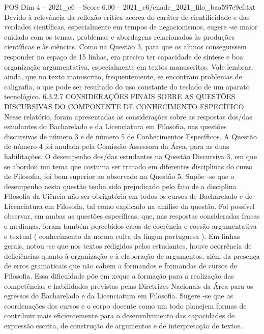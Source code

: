 \begin{textsample}{POS Dim 4 – 2021\_c6 – Score 6.00 – 2021\_c6/enade\_2021\_filo\_baa597e9cf.txt}
Devido à relevância da reflexão crítica acerca do caráter de cientificidade e das verdades científicas, especialmente em tempos de negacionismos, sugere -se maior cuidado com os temas, problemas e abordagens relacionados às produções científicas e às ciências.
Como na Questão 3, para que os alunos conseguissem responder no espaço de 15 linhas, era preciso ter capacidade de síntese e boa organização argumentativa, especialmente em textos manuscritos.
Vale lembrar, ainda, que no texto manuscrito, frequentemente, se encontram problemas de caligrafia, o que pode ser resultado do uso constante do teclado de um aparato tecnológico. 6.3.2.7 CONSIDERAÇÕES FINAIS SOBRE AS QUESTÕES DISCURSIVAS DO COMPONENTE DE CONHECIMENTO ESPECÍFICO Nesse relatório, foram apresentadas as considerações sobre as respostas dos/das estudantes do Bacharelado e da Licenciatura em Filosofia, nas questões discursivas de número 3 e de número 5 de Conhecimentos Específicos.
A Questão de número 4 foi anulada pela Comissão Assessora da Área, para as duas habilitações.
O desempenho dos/das estudantes na Questão Discursiva 3, em que se abordou um tema que costuma ser tratado em diferentes disciplinas do curso de Filosofia, foi bem superior ao observado na Questão 5.
Supõe -se que o desempenho nesta questão tenha sido prejudicado pelo fato de a disciplina Filosofia da Ciência não ser obrigatória em todos os cursos de Bacharelado e de Licenciatura em Filosofia, tal como explicado na análise da questão.
Foi possível observar, em ambas as questões específicas, que, nas respostas consideradas fracas e medianas, foram também percebidos erros de coerência e coesão argumentativa e textual ( conhecimento da norma culta da língua portuguesa ).
Em linhas gerais, notou -se que nos textos redigidos pelos estudantes, houve ocorrência de deficiências quanto à organização e à elaboração de argumentos, além da presença de erros gramaticais que não cabem a formandos e formandas de cursos de Filosofia.
Essa dificuldade põe em xeque a formação para a realização das competências e habilidades previstas pelas Diretrizes Nacionais da Área para os egressos do Bacharelado e da Licenciatura em Filosofia.
Sugere -se que as coordenações dos cursos e o corpo docente como um todo planejem formas de contribuir mais eficientemente para o desenvolvimento das capacidades de expressão escrita, de construção de argumentos e de interpretação de textos.

\end{textsample}
